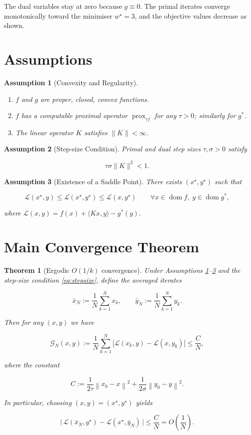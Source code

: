 \documentclass{article}
\newtheorem{theorem}{Theorem}
\newtheorem{assumption}{Assumption}
\newcommand{\prox}{\operatorname{prox}}
\newcommand{\dom}{\operatorname{dom}}
\newcommand{\norm}[1]{\left\|#1\right\|}
\begin{document}
The dual variables stay at zero because $g\equiv0$.  
The primal iterates converge monotonically toward the minimiser $w^{\star}=3$, and the objective values decrease as shown.

\newpage
\section*{Assumptions}
\begin{assumption}[Convexity and Regularity]\label{ass:convex}
\begin{enumerate}
\item $f$ and $g$ are proper, closed, convex functions.
\item $f$ has a computable proximal operator $\prox_{\tau f}$ for any $\tau>0$; similarly for $g^{*}$.
\item The linear operator $K$ satisfies $\|K\|<\infty$.
\end{enumerate}
\end{assumption}

\begin{assumption}[Step‑size Condition]\label{ass:stepsize}
Primal and dual step sizes $\tau,\sigma>0$ satisfy  

\[
\tau\sigma\|K\|^{2}<1.
\tag{4}
\]

\end{assumption}

\begin{assumption}[Existence of a Saddle Point]\label{ass:saddle}
There exists $(x^{\star},y^{\star})$ such that  

\[
\mathcal L(x^{\star},y)\le \mathcal L(x^{\star},y^{\star})\le\mathcal L(x,y^{\star})\qquad\forall x\in\dom f,\;y\in\dom g^{*},
\]

where $\mathcal L(x,y)=f(x)+\langle Kx,y\rangle-g^{*}(y)$.
\end{assumption}

\section*{Main Convergence Theorem}
\begin{theorem}[Ergodic $O(1/k)$ convergence]\label{thm:ergodic}
Under Assumptions \ref{ass:convex}–\ref{ass:saddle} and the step‑size condition \eqref{eq:stepsize}, define the averaged iterates  

\[
\bar x_{N}:=\frac{1}{N}\sum_{k=1}^{N}x_{k},
\qquad
\bar y_{N}:=\frac{1}{N}\sum_{k=1}^{N}y_{k}.
\]

Then for any $(x,y)$ we have  

\[
\mathcal G_{N}(x,y):=
\frac{1}{N}\sum_{k=1}^{N}\bigl[\mathcal L(x_{k},y)-\mathcal L(x,y_{k})\bigr]
\le
\frac{C}{N},
\tag{5}
\]

where the constant  

\[
C:=\frac{1}{2\tau}\norm{x_{0}-x}^{2}
     +\frac{1}{2\sigma}\norm{y_{0}-y}^{2}.
\tag{6}
\]

In particular, choosing $(x,y)=(x^{\star},y^{\star})$ yields  

\[
\bigl|\,\mathcal L(\bar x_{N},y^{\star})-\mathcal L(x^{\star},\bar y_{N})\,\bigr|
\le\frac{C}{N}=O\!\left(\frac{1}{N}\right).
\]
\end{theorem}
\end{document}
